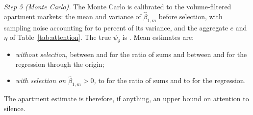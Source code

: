 \emph{Step 5 (Monte Carlo).} The Monte Carlo is calibrated to the \attMCmarkets{} volume-filtered apartment markets: the mean and variance of $\hat\beta_{1,m}$ before selection, with sampling noise accounting for \attMCshareLo{} to \attMCshareHi{} percent of its variance, and the aggregate $e$ and $\eta$ of Table~\ref{tab:attention}. The true $\psi_\delta$ is \attMCtrue{}. Mean estimates are:
\begin{itemize}
    \item \emph{without selection,} between \attMCromLo{} and \attMCromHi{} for the ratio of sums and between \attMColsLo{} and \attMColsHi{} for the regression through the origin;
    \item \emph{with selection on $\hat\beta_{1,m}>0$,} \attMCromSelLo{} to \attMCromSelHi{} for the ratio of sums and \attMColsSelLo{} to \attMColsSelHi{} for the regression.
\end{itemize}
The apartment estimate is therefore, if anything, an upper bound on attention to silence.
